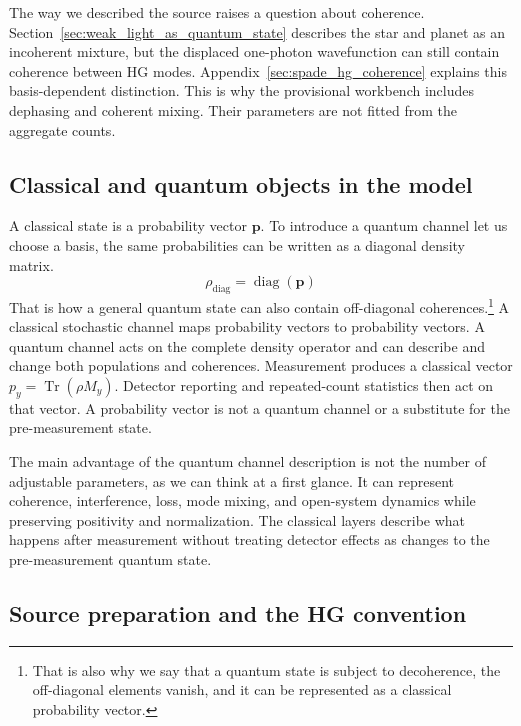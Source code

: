 The way we described the source raises a question about coherence.  Section~\ref{sec:weak_light_as_quantum_state} describes the star and planet as an incoherent mixture, but the displaced one-photon wavefunction can still contain coherence between HG modes.  Appendix~\ref{sec:spade_hg_coherence} explains this basis-dependent distinction.  This is why the provisional workbench includes dephasing and coherent mixing.  Their parameters are not fitted from the aggregate counts.

\subsection{Classical and quantum objects in the model}

A classical state is a probability vector $\boldsymbol p$.  To introduce a quantum channel let us choose a basis, the same probabilities can be written as a diagonal density matrix.
\begin{equation}
    \rho_{\mathrm{diag}}=\operatorname{diag}(\boldsymbol p)
    \label{eq:spade_classical_embedding}
\end{equation}
That is how a general quantum state can also contain off-diagonal coherences.\footnote{That is also why we say that a quantum state is subject to decoherence, the off-diagonal elements vanish, and it can be represented as a classical probability vector.}
A classical stochastic channel maps probability vectors to probability vectors.  A quantum channel acts on the complete density operator and can describe and change both populations and coherences.  Measurement produces a classical vector $p_y=\operatorname{Tr}(\rho M_y)$.  Detector reporting and repeated-count statistics then act on that vector.  A probability vector is not a quantum channel or a substitute for the pre-measurement state.

\faLightbulb \hspace{5pt} The main advantage of the quantum channel description is not the number of adjustable parameters, as we can think at a first glance.  It can represent coherence, interference, loss, mode mixing, and open-system dynamics while preserving positivity and normalization.  The classical layers describe what happens after measurement without treating detector effects as changes to the pre-measurement quantum state.


\subsection{Source preparation and the HG convention}

